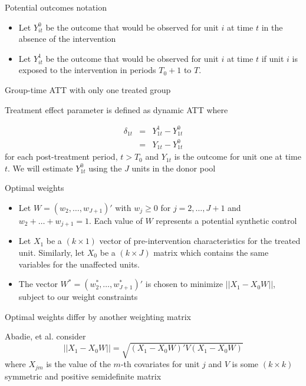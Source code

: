 \documentclass{beamer}
\begin{document}
\begin{frame}{Potential outcomes notation}

		\begin{itemize}
		\item Let $Y_{it}^0$ be the outcome that would be observed for unit $i$ at time $t$ in the absence of the intervention
		\item Let $Y_{it}^1$ be the outcome that would be observed for unit $i$ at time $t$ if unit $i$ is exposed to the intervention in periods $T_0+1$ to $T$.
		\end{itemize}

\end{frame}

\begin{frame}{Group-time ATT with only one treated group}

Treatment effect parameter is defined as dynamic ATT where 

\begin{eqnarray*}
\delta_{1t}&=&Y_{1t}^1 - Y_{1t}^0 \\
&=& Y_{1t} - Y_{1t}^0 
\end{eqnarray*} for each post-treatment period, $t>T_0$ and $Y_{1t}$ is the outcome for unit one at time $t$. We will estimate $Y^0_{1t}$ using the $J$ units in the donor pool 

\end{frame}

\begin{frame}{Optimal weights}
	
	\begin{itemize}
	\item Let $W=(w_2, \dots, w_{J+1})'$ with $w_j\geq 0$ for $j=2, \dots, J+1$ and $w_2+\dots+w_{j+1}=1$. Each value of $W$ represents a potential synthetic control
	\item Let $X_1$ be a $(k\times 1)$ vector of pre-intervention characteristics for the treated unit.  Similarly, let $X_0$ be a $(k\times J)$ matrix which contains the same variables for the unaffected units.
	\item The vector $W^*=(w_2^*, \dots, w_{J+1}^*)'$ is chosen to minimize $||X_1-X_0W||$, subject to our weight constraints
	\end{itemize}
\end{frame}

\begin{frame}{Optimal weights differ by another weighting matrix}
	
Abadie, et al. consider $$||X_1 - X_0W||=\sqrt{(X_1-X_0W)'V(X_1-X_0W)}$$where $X_{jm}$ is the value of the $m$-th covariates for unit $j$ and $V$ is some $(k\times k)$ symmetric and positive semidefinite matrix

\end{frame}
\end{document}

